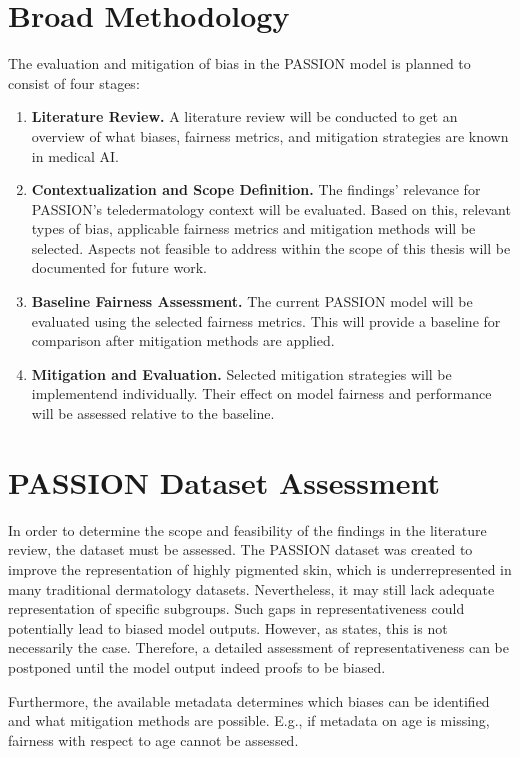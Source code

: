 \documentclass[12pt, a4paper, oneside]{book}   	%
\begin{document}
		\section{Broad Methodology}
			The evaluation and mitigation of bias in the PASSION model is planned to consist of four stages:
			\begin{enumerate}
				\item \textbf{Literature Review.} A literature review will be conducted to get an overview of what biases, fairness metrics, and mitigation strategies are known in medical \gls{AI}.
				
				\item \textbf{Contextualization and Scope Definition.} The findings' relevance for PASSION's \gls{teledermatology} context will be evaluated. Based on this, relevant types of bias, applicable fairness metrics and mitigation methods will be selected. Aspects not feasible to address within the scope of this thesis will be documented for future work.
				
				\item \textbf{Baseline Fairness Assessment.} The current PASSION model will be evaluated using the selected fairness metrics. This will provide a baseline for comparison after mitigation methods are applied.
				
				\item \textbf{Mitigation and Evaluation.} Selected mitigation strategies will be implementend individually. Their effect on model fairness and performance will be assessed relative to the baseline.
			\end{enumerate}
		
		\section{PASSION Dataset Assessment}
			In order to determine the scope and feasibility of the findings in the literature review, the dataset must be assessed.
			The PASSION dataset was created to improve the representation of highly pigmented skin, which is underrepresented in many traditional dermatology datasets. Nevertheless, it may still lack adequate representation of specific subgroups. Such gaps in representativeness could potentially lead to biased model outputs. However, as \textcite{Mehrabi_2021} states, this is not necessarily the case. Therefore, a detailed assessment of representativeness can be postponed until the model output indeed proofs to be biased.
			
			Furthermore, the available metadata determines which biases can be identified and what mitigation methods are possible. E.g., if metadata on age is missing, fairness with respect to age cannot be assessed.
			
\end{document}

